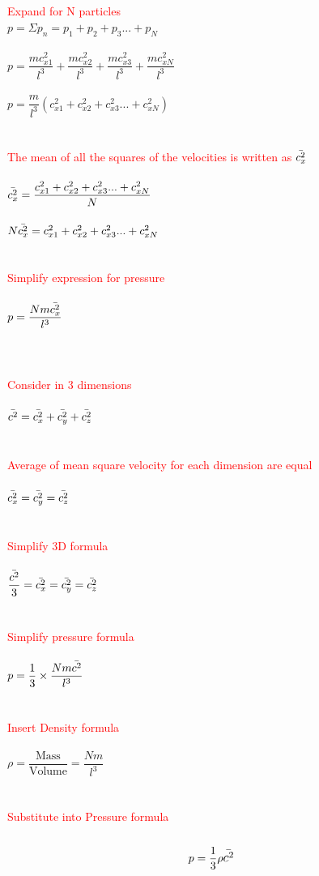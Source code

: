 \documentclass{article}[18pt]
\begin{document}
\\
\\
\textcolor{red}{Expand for N particles}\\
$p=\Sigma p_n=p_1+p_2+p_3...+p_N$\\
\\
$p=\dfrac{mc_{x1}^2}{l^3}+\dfrac{mc_{x2}^2}{l^3}+\dfrac{mc_{x3}^2}{l^3}+\dfrac{mc_{xN}^2}{l^3}$\\
\\
$p=\dfrac{m}{l^3}(c_{x1}^2+c_{x2}^2+c_{x3}^2...+c_{xN}^2)$\\
\\
\\
\textcolor{red}{The mean of all the squares of the velocities is written as $\mathlarger{\bar{c_x^2}}$}\\
\\
$\mathlarger{\bar{c_x^2}}=\dfrac{c_{x1}^2+c_{x2}^2+c_{x3}^2...+c_{xN}^2}{N}$\\
\\
$N\mathlarger{\bar{c_x^2}}=c_{x1}^2+c_{x2}^2+c_{x3}^2...+c_{xN}^2$\\
\\
\\
\textcolor{red}{Simplify expression for pressure}\\
\\
$p=\dfrac{Nm\mathlarger{\bar{c_x^2}}}{l^3}$\\
\\
\\
\\
\textcolor{red}{Consider in 3 dimensions}\\
\\
$\mathlarger{\bar{c^2}=\bar{c_x^2}+\bar{c_y^2}+\bar{c_z^2}}$\\
\\
\\
\textcolor{red}{Average of mean square velocity for each dimension are equal}\\
\\
$\mathlarger{\bar{c_x^2}=\bar{c_y^2}=\bar{c_z^2}}$\\
\\
\\
\textcolor{red}{Simplify 3D formula}\\
\\
$\mathlarger{\dfrac{\bar{c^2}}{3}=\bar{c_x^2}=\bar{c_y^2}=\bar{c_z^2}}$\\
\\
\\
\textcolor{red}{Simplify pressure formula}\\
\\
$p=\dfrac{1}{3}\times\dfrac{Nm\mathlarger{\bar{c^2}}}{l^3}$\\
\\
\\
\textcolor{red}{Insert Density formula}\\
\\
$\rho=\dfrac{\text{Mass}}{\text{Volume}}=\dfrac{Nm}{l^3}$
\\
\\
\\
\textcolor{red}{Substitute into Pressure formula}\\
\\
$$p=\frac{1}{3}\rho\mathlarger{\bar{c^2}}$$
\newpage
\end{document}
